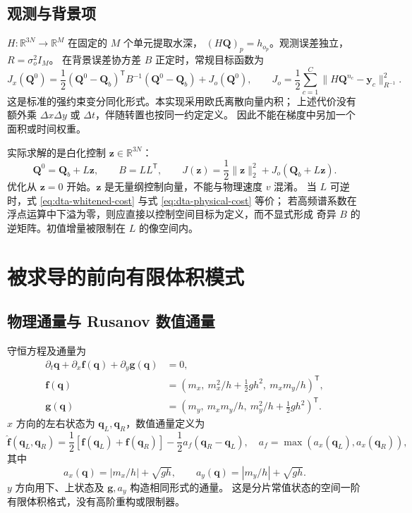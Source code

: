 \documentclass[12pt,a4paper]{article}
\newcommand{\Q}{\mathbf{Q}}
\newcommand{\q}{\mathbf{q}}
\newcommand{\R}{\mathbb{R}}
\newcommand{\trans}{^{\mathsf T}}
\begin{document}
\subsection{观测与背景项}

$H:\R^{3N}\to\R^{M}$ 在固定的 $M$ 个单元提取水深，
$(H\Q)_p=h_{o_p}$。观测误差独立，$R=\sigma_o^2 I_M$。
在背景误差协方差 $B$ 正定时，常规目标函数为
\begin{equation}
 J_x(\Q^0)=\frac12(\Q^0-\Q_b)\trans B^{-1}(\Q^0-\Q_b)
       +J_o(\Q^0),
 \qquad
 J_o=\frac12\sum_{c=1}^{C}\|H\Q^{n_c}-\mathbf y_c\|_{R^{-1}}^2.
 \label{eq:dta-physical-cost}
\end{equation}
这是标准的强约束变分同化形式\cite{asch2016data}。本实现采用欧氏离散向量内积；
上述代价没有额外乘 $\Delta x\Delta y$ 或 $\Delta t$，伴随转置也按同一约定定义。
因此不能在梯度中另加一个面积或时间权重。

实际求解的是白化控制 $\mathbf z\in\R^{3N}$：
\begin{equation}
 \Q^0=\Q_b+L\mathbf z,\qquad B=LL\trans,\qquad
 J(\mathbf z)=\frac12\|\mathbf z\|_2^2+J_o(\Q_b+L\mathbf z).
 \label{eq:dta-whitened-cost}
\end{equation}
优化从 $\mathbf z=0$ 开始。$\mathbf z$ 是无量纲控制向量，不能与物理速度 $v$ 混淆。
当 $L$ 可逆时，式 \eqref{eq:dta-whitened-cost} 与式 \eqref{eq:dta-physical-cost} 等价；
若高频谱系数在浮点运算中下溢为零，则应直接以控制空间目标为定义，而不显式形成
奇异 $B$ 的逆矩阵。初值增量被限制在 $L$ 的像空间内。

\section{被求导的前向有限体积模式}
\label{sec:dta-forward}

\subsection{物理通量与 Rusanov 数值通量}

守恒方程及通量为
\begin{align}
 \partial_t\q+\partial_x\mathbf f(\q)+\partial_y\mathbf g(\q)&=0,\\
 \mathbf f(\q)&=(m_x,\ m_x^2/h+\tfrac12gh^2,\ m_xm_y/h)\trans,\nonumber\\
 \mathbf g(\q)&=(m_y,\ m_xm_y/h,\ m_y^2/h+\tfrac12gh^2)\trans.
 \label{eq:dta-flux}
\end{align}
$x$ 方向的左右状态为 $\q_L,\q_R$，数值通量定义为
\begin{equation}
 \widehat{\mathbf f}(\q_L,\q_R)
 =\frac12[\mathbf f(\q_L)+\mathbf f(\q_R)]
  -\frac12 a_f(\q_R-\q_L),
 \quad a_f=\max(a_x(\q_L),a_x(\q_R)),
 \label{eq:dta-rusanov}
\end{equation}
其中
\begin{equation}
 a_x(\q)=|m_x/h|+\sqrt{gh},\qquad
 a_y(\q)=|m_y/h|+\sqrt{gh}.
 \label{eq:dta-speed}
\end{equation}
$y$ 方向用下、上状态及 $\mathbf g,a_y$ 构造相同形式的通量。
这是分片常值状态的空间一阶有限体积格式，没有高阶重构或限制器。
\end{document}

